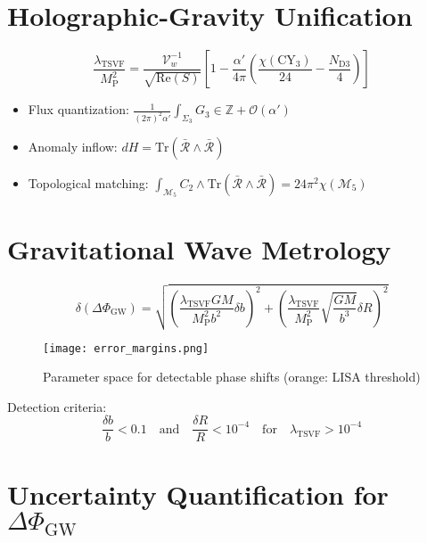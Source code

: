 \documentclass[12pt, onecolumn]{article}
\theoremstyle{definition}
\newcommand{\tsvf}{\lambda_{\mathrm{TSVF}}}
\newcommand{\Mp}{M_{\mathrm{P}}}
\numberwithin{equation}{section}
\begin{document}
\begin{appendices}
\section{Holographic-Gravity Unification}  
\label{app:holography}  

\begin{equation}  
\frac{\tsvf}{\Mp^2} = \frac{\mathcal{V}_w^{-1}}{\sqrt{\mathrm{Re}(S)}} \left[1 - \frac{\alpha'}{4\pi}\left(\frac{\chi(\text{CY}_3)}{24} - \frac{N_{\text{D3}}}{4}\right)\right]
\end{equation}

\begin{itemize}
\item Flux quantization: $\frac{1}{(2\pi)^2\alpha'} \int_{\Sigma_3} G_3 \in \mathbb{Z} + \mathcal{O}(\alpha')$
\item Anomaly inflow: $dH = \mathrm{Tr}(\bar{\mathcal{R}} \wedge \bar{\mathcal{R}})$
\item Topological matching: $\int_{\mathcal{M}_5} C_2 \wedge \mathrm{Tr}(\bar{\mathcal{R}} \wedge \bar{\mathcal{R}}) = 24\pi^2\chi(\mathcal{M}_5)$
\end{itemize}

\section{Gravitational Wave Metrology}  
\label{app:gw_metrology}  

\begin{equation}  
\delta(\Delta\Phi_{\text{GW}}) = \sqrt{\left(\frac{\tsvf GM}{\Mp^2 b^2}\delta b\right)^2 + \left(\frac{\tsvf}{\Mp^2}\sqrt{\frac{GM}{b^3}}\delta R\right)^2}
\end{equation}

\begin{figure}[htbp]
\centering
\texttt{[image: error\_margins.png]}
\caption{Parameter space for detectable phase shifts (orange: LISA threshold)}
\label{fig:gw_errors}
\end{figure}

Detection criteria:
\begin{equation}  
\frac{\delta b}{b} < 0.1 \quad \text{and} \quad \frac{\delta R}{R} < 10^{-4} \quad \text{for} \quad \tsvf > 10^{-4}
\end{equation}

\section{Uncertainty Quantification for \texorpdfstring{$\Delta\Phi_{\text{GW}}$}{ΔΦGW}}
\label{app:gw_errors} %


\end{appendices}
\end{document}
